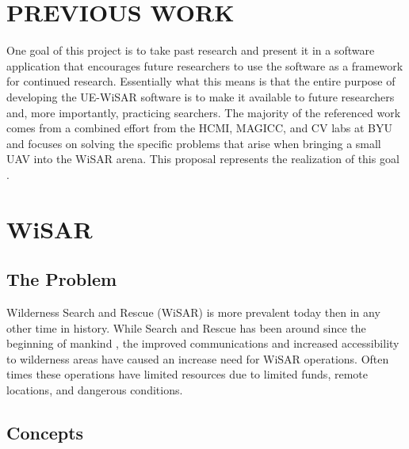 \section{PREVIOUS WORK}
One goal of this project is to take past research and present it in a software
application that encourages future researchers to use the software as a
framework for continued research.  Essentially what this means is that the
entire purpose of developing the UE-WiSAR software is to make it available
to future researchers and, more importantly, practicing searchers.  The majority
of the referenced work comes from a combined effort from the HCMI, MAGICC, and CV labs at BYU and focuses on solving
the specific problems that arise when bringing a small UAV into the WiSAR arena.
This proposal represents the realization of this goal
\cite{lin2010supporting}.
  
  
\section{WiSAR}
\subsection{The Problem}
Wilderness Search and Rescue (WiSAR) is more prevalent today then in any other
time in history.  While Search and Rescue has been around since the beginning of
mankind \cite[p.~13]{setnicka1980}, the improved communications and increased
accessibility to wilderness areas have caused an increase need for WiSAR
operations.  Often times these operations have limited resources due to limited
funds, remote locations, and dangerous conditions.


\subsection{Concepts}

